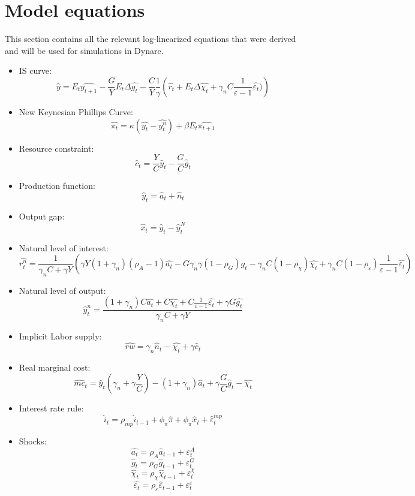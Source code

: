 \documentclass[10pt,a4paper]{article}
\begin{document}
\section{Model equations}
This section contains all the relevant log-linearized equations that were derived and will be used for simulations in Dynare.
\begin{itemize}
 \item IS curve:
 $$
 \hat{y}=E_t\hat{y_{t+1}}-\frac{G}{Y} E_{t} \Delta\hat{g_t} - \frac{C}{Y} \frac{1}{\gamma} \left(\hat{r_t}+E_{t}\Delta\hat{\chi_t}+ \gamma_nC\frac{1}{\varepsilon-1}\hat{\varepsilon_t})\right)
 $$
 \item New Keynesian Phillips Curve:
 $$
 \hat{\pi_t} =
  \kappa (\hat{y_t}-\hat{y_t^n})
 + \beta E_t\hat{\pi_{t+1}}
 $$
 \item Resource constraint:
 $$\hat{c}_{t}=\frac{Y}{C}\hat{y}_{t}-\frac{G}{C}\hat{g}_{t}$$
 \item Production function:
 $$\hat{y}_{t}=\hat{a}_{t}+\hat{n}_{t}$$
 \item Output gap:
 $$ \hat{x}_t = \hat{y}_t - \hat{y}_t^N $$
 \item Natural level of interest:
 $$
 \hat{r_t^n}=\frac{1}{\gamma_nC+\gamma Y} 
 \left(
 \gamma Y(1+\gamma_n)(\rho_A-1)\hat{a_t}-G\gamma_n\gamma (1-\rho_G)\hat{g_t}-\gamma_nC(1-\rho_\chi)\hat{\chi_t} +\gamma_nC(1-\rho_\varepsilon)\frac{1}{\varepsilon-1}\hat{\varepsilon_t}
 \right)
 $$
 \item Natural level of output:
 $$\hat{y}_t^n = \frac{(1 +\gamma_n)C \hat{a_t} + C \hat{\chi_t} + C\frac{1}{\varepsilon-1}\hat{\varepsilon_t} + \gamma G \hat{g_t}}{\gamma_n C + \gamma Y }$$
 \item Implicit Labor supply:
  $$\hat{rw}=\gamma_{n}\hat{n}_{t}-\hat{\chi_{t}}+\gamma\hat{c}_{t}$$  
 \item Real marginal cost:
 $$\hat{mc}_{t}=\hat{y}_{t}\left(\gamma_{n}+\gamma\frac{Y}{C}\right)-\left(1+\gamma_{n}\right)\hat{a}_{t}+\gamma\frac{G}{C}\hat{g}_{t}-\hat{\chi_{t}}$$
 \item Interest rate rule:
 $$\hat{i}_{t}=\rho_{mp} \hat{i}_{t-1} +\phi_{\pi}\hat{\pi}+\phi_{\pi}\hat{x}_{t}+\hat{\varepsilon}_{t}^{mp}$$
 \item Shocks:
 $$\hat{a_t}=\rho_A\hat{a}_{t-1} + \varepsilon_t^A  $$
 $$\hat{g}_t= \rho_G \hat{g}_{t-1}+ \varepsilon_t^G $$
 $$\hat{\chi}_t= \rho_{\chi}\hat{\chi}_{t-1}+ \varepsilon_t^{\chi}$$
 $$\hat{\varepsilon_t}= \rho_\varepsilon \hat{\varepsilon}_{t-1}+ \varepsilon_t^{\varepsilon}$$
\end{itemize}
\end{document}

